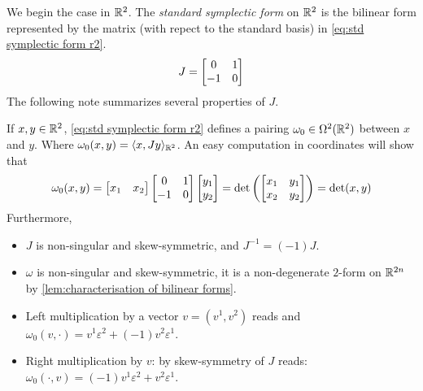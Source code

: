 \documentclass[../main-v2-manifolds.tex]{subfiles}
\begin{document}
%
We begin the case in $\mathbb{R}^2$. The \emph{standard symplectic form} on $\mathbb{R}^2$ is the bilinear form represented by the matrix (with repect to the standard basis) in \cref{eq:std symplectic form r2}.
\begin{equation}
    J = \mqty[0 & 1\\ -1 & 0]
    \label{eq:std symplectic form r2}
\end{equation}
The following note summarizes several properties of $J$.
\begin{note}\label{note:properties of std symplectic form r2}
    If $x,y\in\mathbb{R}^2$, \cref{eq:std symplectic form r2} defines a pairing $\omega_0\in \Omega^2(\mathbb{R}^2)$ between $x$ and $y$. Where $\omega_0(x,y) = \langle x, Jy\rangle_{\mathbb{R}^{2}}$. An easy computation in coordinates will show that
    \begin{equation}
        \omega_0(x,y) = \begin{bmatrix}x_1 & x_2
        \end{bmatrix}\begin{bmatrix}0 & 1 \\ -1 & 0\end{bmatrix}\begin{bmatrix} y_1 \\ y_2\end{bmatrix} = \det\qty(\begin{bmatrix} x_1 & y_1 \\ x_2 & y_2\end{bmatrix}) = \det(x,y)
        \label{eq:std symplectic action pw r2}
    \end{equation}
    Furthermore, 
    \begin{itemize}
        \item $J$ is non-singular and skew-symmetric, and $J^{-1} = (-1)J$.
        \item $\omega$ is non-singular and skew-symmetric, it is a non-degenerate $2$-form on $\mathbb{R}^{2n}$ by \cref{lem:characterisation of bilinear forms}.
        \item Left multiplication by a vector $v = (v^1, v^2)$ reads 
        and $\omega_0(v,\cdot) = v^1\varepsilon^{2} + (-1)v^2\varepsilon^1$.
        \item Right multiplication by $v$: by skew-symmetry of $J$ reads: $\omega_0(\cdot, v) = (-1)v^1\varepsilon^2 + v^2\varepsilon^1$.
    \end{itemize}    
\end{note}
\end{document}
